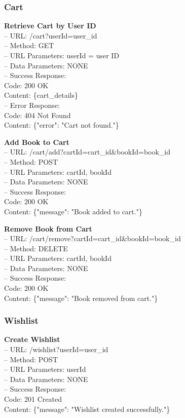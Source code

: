\subsubsection*{Cart}

\textbf{Retrieve Cart by User ID} \\
– URL: /cart?userId={user_id} \\
– Method: GET \\
– URL Parameters: userId = user ID \\
– Data Parameters: NONE \\
– Success Response: \\
Code: 200 OK \\
Content: \{cart_details\} \\
– Error Response: \\
Code: 404 Not Found \\
Content: \{"error": "Cart not found."\}

\textbf{Add Book to Cart} \\
– URL: /cart/add?cartId={cart_id}&bookId={book_id} \\
– Method: POST \\
– URL Parameters: cartId, bookId \\
– Data Parameters: NONE \\
– Success Response: \\
Code: 200 OK \\
Content: \{"message": "Book added to cart."\}

\textbf{Remove Book from Cart} \\
– URL: /cart/remove?cartId={cart_id}&bookId={book_id} \\
– Method: DELETE \\
– URL Parameters: cartId, bookId \\
– Data Parameters: NONE \\
– Success Response: \\
Code: 200 OK \\
Content: \{"message": "Book removed from cart."\}

\subsubsection*{Wishlist}

\textbf{Create Wishlist} \\
– URL: /wishlist?userId={user_id} \\
– Method: POST \\
– URL Parameters: userId \\
– Data Parameters: NONE \\
– Success Response: \\
Code: 201 Created \\
Content: \{"message": "Wishlist created successfully."\}

